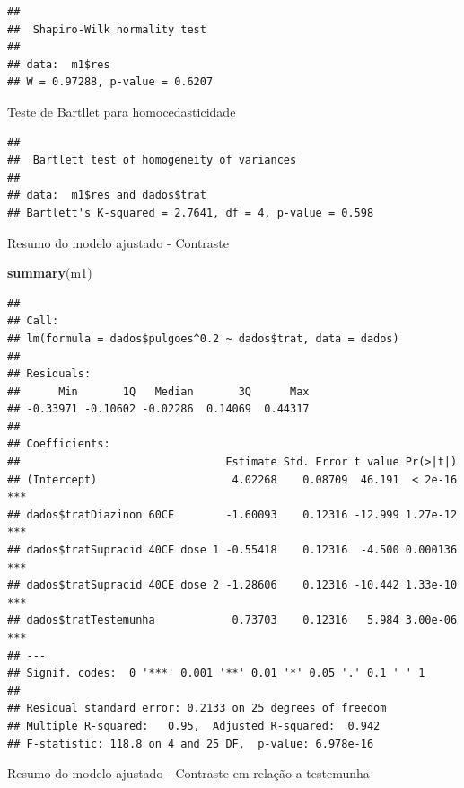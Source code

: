 \documentclass[
]{book}
\newenvironment{Shaded}{\begin{snugshade}}{\end{snugshade}}
\newcommand{\KeywordTok}[1]{\textcolor[rgb]{0.13,0.29,0.53}{\textbf{#1}}}
\newcommand{\NormalTok}[1]{#1}
\newcommand{\OperatorTok}[1]{\textcolor[rgb]{0.81,0.36,0.00}{\textbf{#1}}}
\newcommand{\StringTok}[1]{\textcolor[rgb]{0.31,0.60,0.02}{#1}}
\begin{document}
\begin{verbatim}
## 
##  Shapiro-Wilk normality test
## 
## data:  m1$res
## W = 0.97288, p-value = 0.6207
\end{verbatim}

Teste de Bartllet para homocedasticidade

\begin{Shaded}
\end{Shaded}

\begin{verbatim}
## 
##  Bartlett test of homogeneity of variances
## 
## data:  m1$res and dados$trat
## Bartlett's K-squared = 2.7641, df = 4, p-value = 0.598
\end{verbatim}

Resumo do modelo ajustado - Contraste

\begin{Shaded}
\begin{Highlighting}[]
\KeywordTok{summary}\NormalTok{(m1)}
\end{Highlighting}
\end{Shaded}

\begin{verbatim}
## 
## Call:
## lm(formula = dados$pulgoes^0.2 ~ dados$trat, data = dados)
## 
## Residuals:
##      Min       1Q   Median       3Q      Max 
## -0.33971 -0.10602 -0.02286  0.14069  0.44317 
## 
## Coefficients:
##                                Estimate Std. Error t value Pr(>|t|)    
## (Intercept)                     4.02268    0.08709  46.191  < 2e-16 ***
## dados$tratDiazinon 60CE        -1.60093    0.12316 -12.999 1.27e-12 ***
## dados$tratSupracid 40CE dose 1 -0.55418    0.12316  -4.500 0.000136 ***
## dados$tratSupracid 40CE dose 2 -1.28606    0.12316 -10.442 1.33e-10 ***
## dados$tratTestemunha            0.73703    0.12316   5.984 3.00e-06 ***
## ---
## Signif. codes:  0 '***' 0.001 '**' 0.01 '*' 0.05 '.' 0.1 ' ' 1
## 
## Residual standard error: 0.2133 on 25 degrees of freedom
## Multiple R-squared:   0.95,  Adjusted R-squared:  0.942 
## F-statistic: 118.8 on 4 and 25 DF,  p-value: 6.978e-16
\end{verbatim}

Resumo do modelo ajustado - Contraste em relação a testemunha

\begin{Shaded}
\end{Shaded}
\end{document}
